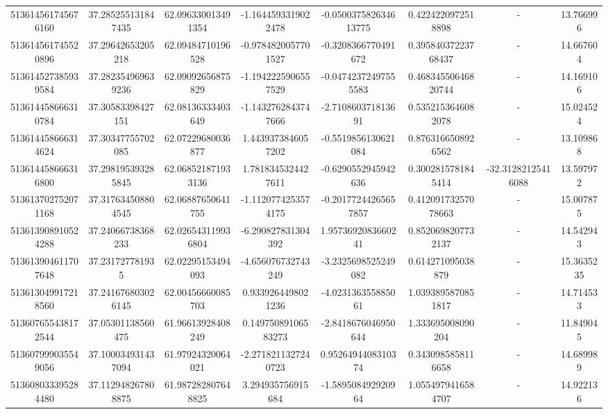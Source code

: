 \documentclass{article}
\begin{document}
\begin{landscape}
\begin{longtable}[c]{S[table-format=18.0]S[table-format=2.15]S[table-format=2.15]S[table-format=-2.17]S[table-format=-2.16]S[table-format=-2.16]S[table-format=-3.16]S[table-format=2.7]}
513614561745676160 & 37.285255131847435 & 62.096330013491354 & -1.1644593319022478   & -0.050037582634613775 & 0.4224220972518898  & {-}                  & 13.766996  \\
513614561745520896 & 37.29642653205218  & 62.09484710196528  & -0.9784820057701527   & -0.3208366770491672   & 0.39584037223768437 & {-}                  & 14.667604  \\
513614527385939584 & 37.282354969639236 & 62.09092656875829  & -1.1942225906557529   & -0.04742372497555583  & 0.46834550646820744 & {-}                  & 14.169106  \\
513614458666310784 & 37.30583398427151  & 62.08136333403649  & -1.1432762843747666   & -2.710860371813691    & 0.5352153646082078  & {-}                  & 15.024524  \\
513614458666314624 & 37.30347755702085  & 62.07229680036877  & 1.4439373846057202    & -0.5519856130621084   & 0.8763166508926562  & {-}                  & 13.109868  \\
513614458666316800 & 37.298195393285845 & 62.068521871933136 & 1.7818345324427611    & -0.6290552945942636   & 0.3002815781845414  & -32.31282125416088  & 13.597972  \\
513613702752071168 & 37.317634508804545 & 62.06887650641755  & -1.1120774253574175   & -0.20177244265657857  & 0.41209173257078663 & {-}                  & 15.007875  \\
513613908910524288 & 37.24066738368233  & 62.026543119936804 & -6.290827831304392    & 1.9573692083660241    & 0.8520698207732137  & {-}                  & 14.542943  \\
513613904611707648 & 37.231727781935    & 62.02295153494093  & -4.656076732743249    & -3.2325698525249082   & 0.614271095038879   & {-}                  & 15.3635235 \\
513613049917218560 & 37.241676803026145 & 62.00456660085703  & 0.9339264498021236    & -4.023136355885061    & 1.0393895870851817  & {-}                  & 14.714533  \\
513607655438172544 & 37.05301138560475  & 61.96613928408249  & 0.14975089106583273   & -2.8418676046950644   & 1.333695008090204   & {-}                  & 11.849045  \\
513607999035549056 & 37.100034931437094 & 61.97924320064021  & -2.2718211327240723   & 0.9526494408310374    & 0.3430985858116658  & {-}                  & 14.689989  \\
513608033395284480 & 37.112948267808875 & 61.987282807648825 & 3.294935756915684     & -1.589508492920964    & 1.0554979416584707  & {-}                  & 14.922136  \\

\end{longtable}
\end{landscape}
\end{document}
